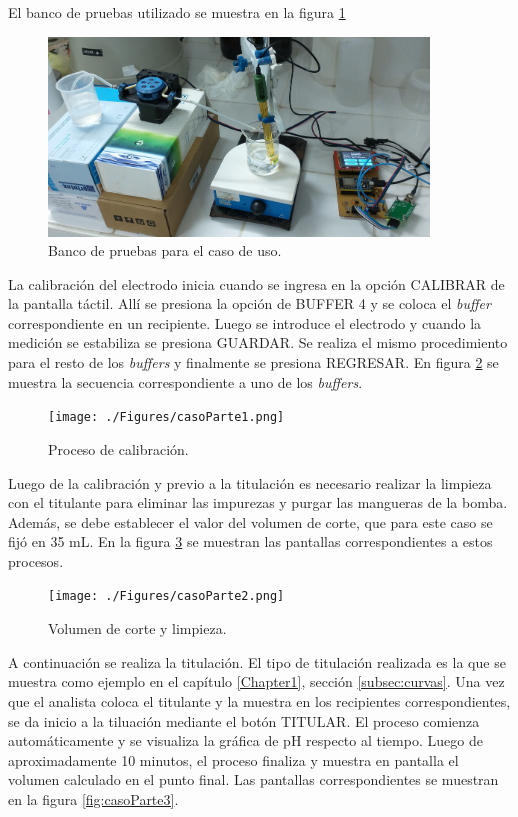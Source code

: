 El banco de pruebas utilizado se muestra en la figura \ref{fig:bancoPruebasCompleto}

\begin{figure}[htbp]
	\centering
	\includegraphics[width=0.9\textwidth]{./Figures/casoTitulacion.jpg}
	\caption{Banco de pruebas para el caso de uso.}
	\label{fig:bancoPruebasCompleto}
\end{figure}

La calibración del electrodo inicia cuando se ingresa en la opción CALIBRAR de la pantalla táctil. Allí se presiona la opción de BUFFER 4 y se coloca el \textit{buffer} correspondiente en un recipiente. Luego se introduce el electrodo y cuando la medición se estabiliza se presiona GUARDAR. Se realiza el mismo procedimiento para el resto de los \textit{buffers} y finalmente se presiona REGRESAR. En figura \ref{fig:casoParte1} se muestra la secuencia correspondiente a uno de los \textit{buffers}.

\begin{figure}[htbp]
	\centering
	\texttt{[image: ./Figures/casoParte1.png]}
	\caption{Proceso de calibración.}
	\label{fig:casoParte1}
\end{figure}

Luego de la calibración y previo a la titulación es necesario realizar la limpieza con el titulante para eliminar las impurezas y purgar las mangueras de la bomba. Además, se debe establecer el valor del volumen de corte, que para este caso se fijó en 35 mL. En la figura \ref{fig:casoParte2} se muestran las pantallas correspondientes a estos procesos.

\begin{figure}[htbp]
	\centering
	\texttt{[image: ./Figures/casoParte2.png]}
	\caption{Volumen de corte y limpieza.}
	\label{fig:casoParte2}
\end{figure}

A continuación se realiza la titulación. El tipo de titulación realizada es la que se muestra como ejemplo en el capítulo \ref{Chapter1}, sección \ref{subsec:curvas}. Una vez que el analista coloca el titulante y la muestra en los recipientes correspondientes, se da inicio a la tiluación mediante el botón TITULAR. El proceso comienza automáticamente y se visualiza la gráfica de pH respecto al tiempo. Luego de aproximadamente 10 minutos, el proceso finaliza y muestra en pantalla el volumen calculado en el punto final. Las pantallas correspondientes se muestran en la figura \ref{fig:casoParte3}.

